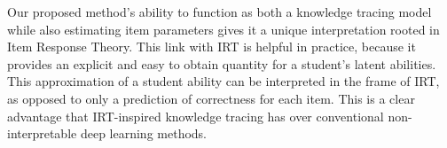 Our proposed method's ability to function as both a knowledge tracing model while also estimating item parameters gives it a unique interpretation rooted in Item Response Theory. This link with IRT is helpful in practice, because it provides an explicit and easy to obtain quantity for a student's latent abilities. This approximation of a student ability can be interpreted in the frame of IRT, as opposed to only a prediction of correctness for each item. This is a clear advantage that IRT-inspired knowledge tracing has over conventional non-interpretable deep learning methods.

